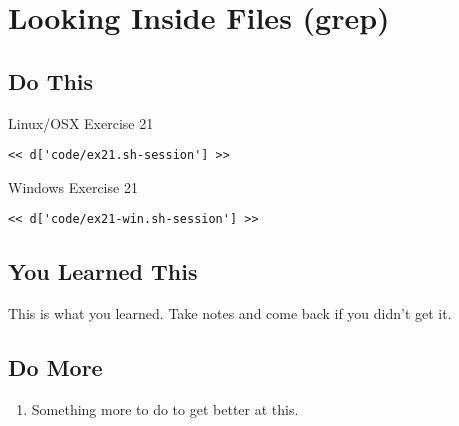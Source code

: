 \chapter{Looking Inside Files (grep)}

\section{Do This}

\begin{code}{Linux/OSX Exercise 21}
\begin{Verbatim}
<< d['code/ex21.sh-session'] >>
\end{Verbatim}
\end{code}

\begin{code}{Windows Exercise 21}
\begin{Verbatim}
<< d['code/ex21-win.sh-session'] >>
\end{Verbatim}
\end{code}

\section{You Learned This}

This is what you learned.  Take notes and come back if you didn't get it.

\section{Do More}

\begin{enumerate}
\item Something more to do to get better at this.
\end{enumerate}

